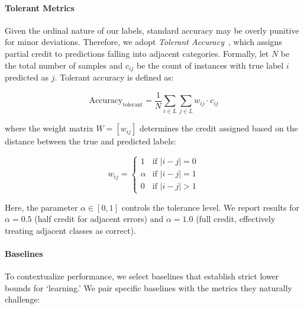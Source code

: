 \documentclass[journal]{IEEEtran}
\begin{document}
\paragraph{Tolerant Metrics} 

Given the ordinal nature of our labels, standard accuracy may be overly punitive for minor deviations. Therefore, we adopt \textit{Tolerant Accuracy}~\cite{wconf}, which assigns partial credit to predictions falling into adjacent categories. Formally, let $N$ be the total number of samples and $c_{ij}$ be the count of instances with true label $i$ predicted as $j$. Tolerant accuracy is defined as:

\begin{equation}
\mathrm{Accuracy}_{\mathrm{tolerant}}
= \frac{1}{N} \sum_{i \in L} \sum_{j \in L} w_{ij} \cdot c_{ij}
\label{eq:tolerant_accuracy}
\end{equation}

where the weight matrix $W = [w_{ij}]$ determines the credit assigned based on the distance between the true and predicted labels:

\begin{equation}
w_{ij} =
\begin{cases}
1 & \text{if } |i - j| = 0 \\
\alpha & \text{if } |i - j| = 1 \\
0 & \text{if } |i - j| > 1
\end{cases}
\end{equation}

Here, the parameter $\alpha \in [0, 1]$ controls the tolerance level. We report results for \(\alpha=0.5\) (half credit for adjacent errors) and \(\alpha=1.0\) (full credit, effectively treating adjacent classes as correct).

\paragraph{Baselines} 
To contextualize performance, we select baselines that establish strict lower bounds for `learning.' We pair specific baselines with the metrics they naturally challenge:
\end{document}
